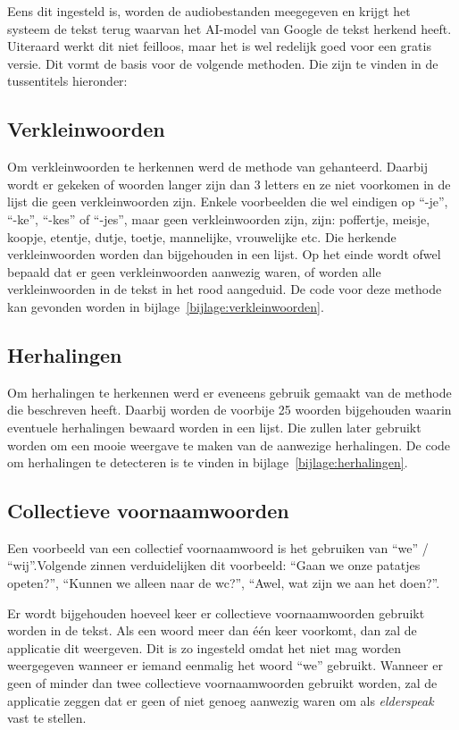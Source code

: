 Eens dit ingesteld is, worden de audiobestanden meegegeven en krijgt het systeem de tekst terug waarvan het AI-model van Google de tekst herkend heeft. Uiteraard werkt dit niet feilloos, maar het is wel redelijk goed voor een gratis versie. Dit vormt de basis voor de volgende methoden. Die zijn te vinden in de tussentitels hieronder:

\subsection{Verkleinwoorden}
Om verkleinwoorden te herkennen werd de methode van \textcite{Standaert2021} gehanteerd. Daarbij wordt er gekeken of woorden langer zijn dan 3 letters en ze niet voorkomen in de lijst die geen verkleinwoorden zijn. Enkele voorbeelden die wel eindigen op ``-je'', ``-ke'', ``-kes'' of ``-jes'', maar geen verkleinwoorden zijn, zijn: poffertje, meisje, koopje, etentje, dutje, toetje, mannelijke, vrouwelijke etc.
Die herkende verkleinwoorden worden dan bijgehouden in een lijst. Op het einde wordt ofwel bepaald dat er geen verkleinwoorden aanwezig waren, of worden alle verkleinwoorden in de tekst in het rood aangeduid. De code voor deze methode kan gevonden worden in bijlage~\ref{bijlage:verkleinwoorden}.

\subsection{Herhalingen}
Om herhalingen te herkennen werd er eveneens gebruik gemaakt van de methode die \textcite{Standaert2021} beschreven heeft. Daarbij worden de voorbije 25 woorden bijgehouden waarin eventuele herhalingen bewaard worden in een lijst.
Die zullen later gebruikt worden om een mooie weergave te maken van de aanwezige herhalingen.
De code om herhalingen te detecteren is te vinden in bijlage~\ref{bijlage:herhalingen}.

\subsection{Collectieve voornaamwoorden}
Een voorbeeld van een collectief voornaamwoord is het gebruiken van ``we'' / ``wij''.Volgende zinnen verduidelijken dit voorbeeld: ``Gaan we onze patatjes opeten?'', ``Kunnen we alleen naar de wc?'', ``Awel, wat zijn we aan het doen?''.

Er wordt bijgehouden hoeveel keer er collectieve voornaamwoorden gebruikt worden in de tekst. Als een woord meer dan één keer voorkomt, dan zal de applicatie dit weergeven. Dit is zo ingesteld omdat het niet mag worden weergegeven wanneer er iemand eenmalig het woord ``we'' gebruikt.
Wanneer er geen of minder dan twee collectieve voornaamwoorden gebruikt worden, zal de applicatie zeggen dat er geen of niet genoeg aanwezig waren om als \textit{elderspeak} vast te stellen.

